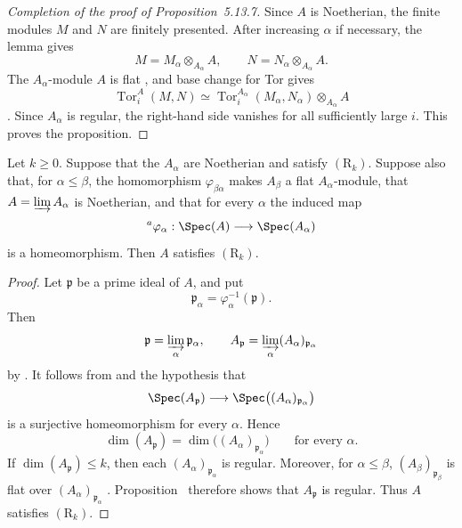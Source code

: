 \begin{proof}[Completion of the proof of Proposition~5.13.7]
Since $A$ is Noetherian, the finite modules $M$ and $N$ are
finitely presented.  After increasing $\alpha$ if necessary, the
lemma gives
\[
  M=M_\alpha\otimes_{A_\alpha}A,
  \qquad
  N=N_\alpha\otimes_{A_\alpha}A.
\]
The $A_\alpha$-module $A$ is flat , and base
change for Tor gives
\[
  \operatorname{Tor}^{A}_i(M,N)
  \simeq
  \operatorname{Tor}^{A_\alpha}_i(M_\alpha,N_\alpha)
  \otimes_{A_\alpha}A
\]
.  Since $A_\alpha$ is regular, the
right-hand side vanishes for all sufficiently large $i$.  This
proves the proposition.
\end{proof}

\begin{corollary}[5.13.8]
\label{IV.5.13.8}
Let $k\geq0$.  Suppose that the $A_\alpha$ are Noetherian and
satisfy $(\mathrm R_k)$.  Suppose also that, for
$\alpha\leq\beta$, the homomorphism $\varphi_{\beta\alpha}$
makes $A_\beta$ a flat $A_\alpha$-module, that
$A=\varinjlim A_\alpha$ is Noetherian, and that for every
$\alpha$ the induced map
\[
  {}^{a}\varphi_\alpha:
  \Spec(A)\longrightarrow\Spec(A_\alpha)
\]
is a homeomorphism.  Then $A$ satisfies $(\mathrm R_k)$.
\end{corollary}

\begin{proof}
Let $\mathfrak p$ be a prime ideal of $A$, and put
\[
  \mathfrak p_\alpha
  =\varphi_\alpha^{-1}(\mathfrak p).
\]
Then
\[
  \mathfrak p=\varinjlim_\alpha\mathfrak p_\alpha,
  \qquad
  A_{\mathfrak p}
  =\varinjlim_\alpha(A_\alpha)_{\mathfrak p_\alpha}
\]
by .  It follows from
 and the hypothesis that
\[
  \Spec(A_{\mathfrak p})
  \longrightarrow
  \Spec\bigl((A_\alpha)_{\mathfrak p_\alpha}\bigr)
\]
is a surjective homeomorphism for every $\alpha$.  Hence
\[
  \dim(A_{\mathfrak p})
  =
  \dim\bigl((A_\alpha)_{\mathfrak p_\alpha}\bigr)
  \qquad\text{for every }\alpha.
\]
If $\dim(A_{\mathfrak p})\leq k$, then each
$(A_\alpha)_{\mathfrak p_\alpha}$ is regular.  Moreover, for
$\alpha\leq\beta$,
$(A_\beta)_{\mathfrak p_\beta}$ is flat over
$(A_\alpha)_{\mathfrak p_\alpha}$ .
Proposition~ therefore shows that
$A_{\mathfrak p}$ is regular.  Thus $A$ satisfies
$(\mathrm R_k)$.
\end{proof}

